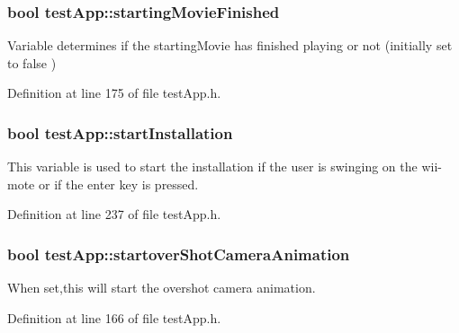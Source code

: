 \hypertarget{classtest_app_aea3cb9f5f0061a42a4953d6b6c949036}{
\subsubsection[{starting\-Movie\-Finished}]{\setlength{\rightskip}{0pt plus 5cm}bool test\-App\-::starting\-Movie\-Finished}}\label{classtest_app_aea3cb9f5f0061a42a4953d6b6c949036}


Variable determines if the starting\-Movie has finished playing or not (initially set to false ) 



Definition at line 175 of file test\-App.\-h.

\hypertarget{classtest_app_a8a65a6d1a473417cec1c2ac2e6116aae}{
\subsubsection[{start\-Installation}]{\setlength{\rightskip}{0pt plus 5cm}bool test\-App\-::start\-Installation}}\label{classtest_app_a8a65a6d1a473417cec1c2ac2e6116aae}


This variable is used to start the installation if the user is swinging on the wii-\/mote or if the enter key is pressed. 



Definition at line 237 of file test\-App.\-h.

\hypertarget{classtest_app_ad2fca6ce5e37462cd820afc48633324d}{
\subsubsection[{startover\-Shot\-Camera\-Animation}]{\setlength{\rightskip}{0pt plus 5cm}bool test\-App\-::startover\-Shot\-Camera\-Animation}}\label{classtest_app_ad2fca6ce5e37462cd820afc48633324d}


When set,this will start the overshot camera animation. 



Definition at line 166 of file test\-App.\-h.


